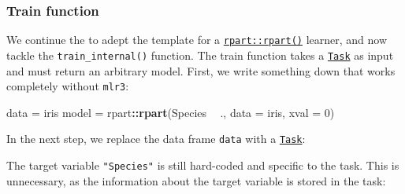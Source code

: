 \documentclass[]{article}
\newenvironment{Shaded}{\begin{snugshade}}{\end{snugshade}}
\newcommand{\DataTypeTok}[1]{\textcolor[rgb]{0.13,0.29,0.53}{#1}}
\newcommand{\DecValTok}[1]{\textcolor[rgb]{0.00,0.00,0.81}{#1}}
\newcommand{\KeywordTok}[1]{\textcolor[rgb]{0.13,0.29,0.53}{\textbf{#1}}}
\newcommand{\NormalTok}[1]{#1}
\newcommand{\OperatorTok}[1]{\textcolor[rgb]{0.81,0.36,0.00}{\textbf{#1}}}
\newcommand{\StringTok}[1]{\textcolor[rgb]{0.31,0.60,0.02}{#1}}
\renewenvironment{Shaded} {\begin{snugshade}\small} {\end{snugshade}}
\begin{document}
\hypertarget{learner-train}{%
\subsubsection{Train function}\label{learner-train}}

We continue the to adept the template for a \href{https://www.rdocumentation.org/packages/rpart/topics/rpart}{\texttt{rpart::rpart()}} learner, and now tackle the \texttt{train\_internal()} function.
The train function takes a \href{https://mlr3.mlr-org.com/reference/Task.html}{\texttt{Task}} as input and must return an arbitrary model.
First, we write something down that works completely without \texttt{mlr3}:

\begin{Shaded}
\begin{Highlighting}[]
\NormalTok{data =}\StringTok{ }\NormalTok{iris}
\NormalTok{model =}\StringTok{ }\NormalTok{rpart}\OperatorTok{::}\KeywordTok{rpart}\NormalTok{(Species }\OperatorTok{~}\StringTok{ }\NormalTok{., }\DataTypeTok{data =}\NormalTok{ iris, }\DataTypeTok{xval =} \DecValTok{0}\NormalTok{)}
\end{Highlighting}
\end{Shaded}

In the next step, we replace the data frame \texttt{data} with a \href{https://mlr3.mlr-org.com/reference/Task.html}{\texttt{Task}}:

\begin{Shaded}
\end{Shaded}

The target variable \texttt{"Species"} is still hard-coded and specific to the task.
This is unnecessary, as the information about the target variable is stored in the task:

\begin{Shaded}
\end{Shaded}
\end{document}

